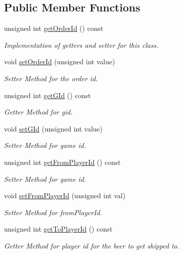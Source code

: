 \subsection*{Public Member Functions}
\begin{DoxyCompactItemize}
\item 
unsigned int \hyperlink{classPlayerEvent_a9313159916c282a20bd69e27b6900679}{get\+Order\+Id} () const
\begin{DoxyCompactList}\small\item\em Implementation of getters and setter for this class. \end{DoxyCompactList}\item 
void \hyperlink{classPlayerEvent_ac1e16d56dfbd072f4bf5d2f73247ff38}{set\+Order\+Id} (unsigned int value)
\begin{DoxyCompactList}\small\item\em Setter Method for the order id. \end{DoxyCompactList}\item 
unsigned int \hyperlink{classPlayerEvent_ab44a2b22c16007d332524231089a9cc1}{get\+G\+Id} () const
\begin{DoxyCompactList}\small\item\em Getter Method for gid. \end{DoxyCompactList}\item 
void \hyperlink{classPlayerEvent_add2e994da90382443c45d533cbffa629}{set\+G\+Id} (unsigned int value)
\begin{DoxyCompactList}\small\item\em Setter Method for game id. \end{DoxyCompactList}\item 
unsigned int \hyperlink{classPlayerEvent_abc4c20973a6eafd4e9628c7264a1702d}{get\+From\+Player\+Id} () const
\begin{DoxyCompactList}\small\item\em Setter Method for game id. \end{DoxyCompactList}\item 
void \hyperlink{classPlayerEvent_a079ed27776a87240c7ac7700f1090df2}{set\+From\+Player\+Id} (unsigned int val)
\begin{DoxyCompactList}\small\item\em Setter Method for from\+Player\+Id. \end{DoxyCompactList}\item 
unsigned int \hyperlink{classPlayerEvent_a341da1afa86a54b8b5f242a7fc071fdc}{get\+To\+Player\+Id} () const
\begin{DoxyCompactList}\small\item\em Getter Method for player id for the beer to get shipped to. \end{DoxyCompactList}\item 

\end{DoxyCompactItemize}
